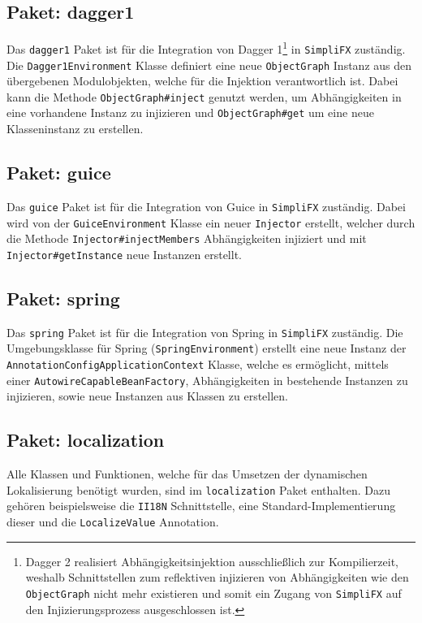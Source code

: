 \subsection{Paket: dagger1}
Das \texttt{dagger1} Paket ist für die Integration von Dagger 1\footnote{Dagger 2 realisiert Abhängigkeitsinjektion ausschließlich zur Kompilierzeit, weshalb Schnittstellen zum reflektiven injizieren von Abhängigkeiten wie den \texttt{ObjectGraph} nicht mehr existieren und somit ein Zugang von \texttt{SimpliFX} auf den Injizierungsprozess ausgeschlossen ist.} in \texttt{SimpliFX} zuständig. Die \texttt{Dagger1Environment} Klasse definiert eine neue \texttt{ObjectGraph} Instanz aus den übergebenen Modulobjekten, welche für die Injektion verantwortlich ist. Dabei kann die Methode \texttt{ObjectGraph\#inject} genutzt werden, um Abhängigkeiten in eine vorhandene Instanz zu injizieren und \texttt{ObjectGraph\#get} um eine neue Klasseninstanz zu erstellen. 
\subsection{Paket: guice}
Das \texttt{guice} Paket ist für die Integration von Guice in \texttt{SimpliFX} zuständig. Dabei wird von der \texttt{GuiceEnvironment} Klasse ein neuer \texttt{Injector} erstellt, welcher durch die Methode \texttt{Injector\#injectMembers} Abhängigkeiten injiziert und mit \texttt{Injector\#getInstance} neue Instanzen erstellt.
\subsection{Paket: spring}
Das \texttt{spring} Paket ist für die Integration von Spring in \texttt{SimpliFX} zuständig.
Die Umgebungsklasse für Spring (\texttt{SpringEnvironment}) erstellt eine neue Instanz der \texttt{AnnotationConfigApplicationContext} Klasse, welche es ermöglicht, mittels einer \texttt{AutowireCapableBeanFactory}, Abhängigkeiten in bestehende Instanzen zu injizieren, sowie neue Instanzen aus Klassen zu erstellen.
\subsection{Paket: localization}
Alle Klassen und Funktionen, welche für das Umsetzen der dynamischen Lokalisierung benötigt wurden, sind im \texttt{localization} Paket enthalten. Dazu gehören beispielsweise die \texttt{II18N} Schnittstelle, eine Standard-Implementierung dieser und die \texttt{LocalizeValue} Annotation. 

